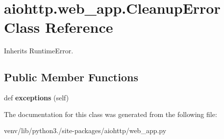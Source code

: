 \hypertarget{classaiohttp_1_1web__app_1_1_cleanup_error}{}\section{aiohttp.\+web\+\_\+app.\+Cleanup\+Error Class Reference}
\label{classaiohttp_1_1web__app_1_1_cleanup_error}


Inherits Runtime\+Error.

\subsection*{Public Member Functions}
\begin{DoxyCompactItemize}
\item 
\mbox{\label{classaiohttp_1_1web__app_1_1_cleanup_error_a76f4a21cb91f53cc8d31fec4b77f59e1}} 
def {\bfseries exceptions} (self)
\end{DoxyCompactItemize}


The documentation for this class was generated from the following file\+:\begin{DoxyCompactItemize}
\item 
venv/lib/python3./site-\/packages/aiohttp/web\+\_\+app.\+py\end{DoxyCompactItemize}
